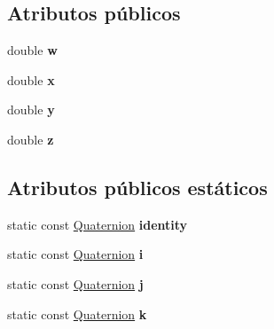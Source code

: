 \subsection*{\-Atributos públicos}
\begin{DoxyCompactItemize}
\item 
\hypertarget{classdfv_1_1Quaternion_a23aa5270c03b5d64c94a3e97b2ca894e}{double {\bfseries w}}\label{classdfv_1_1Quaternion_a23aa5270c03b5d64c94a3e97b2ca894e}

\item 
\hypertarget{classdfv_1_1Quaternion_a76a4ba90b64d86ef098337af97a3bb3b}{double {\bfseries x}}\label{classdfv_1_1Quaternion_a76a4ba90b64d86ef098337af97a3bb3b}

\item 
\hypertarget{classdfv_1_1Quaternion_a48f9f863b0a757040f30dcef9e23ca41}{double {\bfseries y}}\label{classdfv_1_1Quaternion_a48f9f863b0a757040f30dcef9e23ca41}

\item 
\hypertarget{classdfv_1_1Quaternion_a3b931372acd4b7afa7da42aa9fd14b20}{double {\bfseries z}}\label{classdfv_1_1Quaternion_a3b931372acd4b7afa7da42aa9fd14b20}

\end{DoxyCompactItemize}
\subsection*{\-Atributos públicos estáticos}
\begin{DoxyCompactItemize}
\item 
\hypertarget{classdfv_1_1Quaternion_a8bd1254b649bb3324d2f806529c4fbe6}{static const \hyperlink{classdfv_1_1Quaternion}{\-Quaternion} {\bfseries identity}}\label{classdfv_1_1Quaternion_a8bd1254b649bb3324d2f806529c4fbe6}

\item 
\hypertarget{classdfv_1_1Quaternion_a1a8a9980131fc613f070a0aed3cd2499}{static const \hyperlink{classdfv_1_1Quaternion}{\-Quaternion} {\bfseries i}}\label{classdfv_1_1Quaternion_a1a8a9980131fc613f070a0aed3cd2499}

\item 
\hypertarget{classdfv_1_1Quaternion_a155323ce7e793fa223fe5dbb5ef04c74}{static const \hyperlink{classdfv_1_1Quaternion}{\-Quaternion} {\bfseries j}}\label{classdfv_1_1Quaternion_a155323ce7e793fa223fe5dbb5ef04c74}

\item 
\hypertarget{classdfv_1_1Quaternion_ae201531485ff2565059d1ea38e336f06}{static const \hyperlink{classdfv_1_1Quaternion}{\-Quaternion} {\bfseries k}}\label{classdfv_1_1Quaternion_ae201531485ff2565059d1ea38e336f06}

\end{DoxyCompactItemize}
